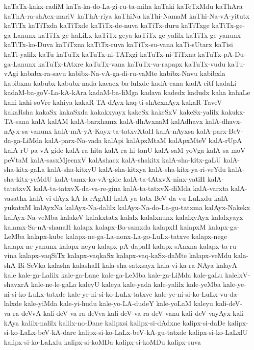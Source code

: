 {kaTaTx-kakx-radiM
kaTa-ka-do-La-gi-ru-ta-miha
kaTaki
kaTeTxMdu
kaThAra
kaThA-ra-shAcx-mariV
kaThA-riya
kaThiNa
kaThi-NamaM
kaThi-Na-vA-yitutx
kaTiTx
kaTiTxda
kaTiTxde
kaTiTx-de-nuva
kaTiTx-duru
kaTiTxge
kaTiTx-ge-ga-Lanunx
kaTiTx-ge-haLiLx
kaTiTx-geya
kaTiTx-ge-yalilx
kaTiTx-ge-yanunx
kaTiTx-ko-Duva
kaTiTxna
kaTiTx-ruva
kaTiTx-su-vana
kaTi-sUtarx
kaTisi
kaTi-yalilx
kaTu
kaTuTx
kaTuTx-ni-TATxgi
kaTuTx-ni-TiTxna
kaTuTx-pA-Du-ga-Lanunx
kaTuTx-tAtxre
kaTuTx-vana
kaTuTx-va-rapapx
kaTuTx-vudu
kaTu-vAgi
kababx-ra-savu
kabibx-Na-vA-ga-di-ru-vaMte
kabibx-Navu
kabibxla
kabibxna
kabubx
kabubx-nada
kacacx-ba-lulxde
kadA-cana
kadA-citf
kadaLi
kadaM-ba-goV-La-kA-kAra
kadaM-ba-liMga
kadava
kadedx
kadudx
kaha
kahaLe
kahi
kahi-soVre
kahiya
kakaR-TA-dAyx-kaq-ti-shAcxnAyx
kakaR-TaveV
kakaRsha
kakaSx
kakaSxda
kakakxyayx
kakeSx
kakeSxV
kakeSx-yalilx
kakukx-TA-sana
kalA
kalAM
kalA-barxhamx
kalA-dhAvxnaM
kalAdhavx
kalA-dhavx-nAyx-sa-vanunx
kalA-mA-yA-Kayx-ta-tatxvXtaH
kalA-nAyxsa
kalA-parx-BeV-da-ga-LiMda
kalA-parx-Na-vada
kalApi
kalApxMtaM
kalApxMteV
kalA-rUpA
kalA-rU-pa-vA-gide
kalA-ra-hita
kalA-ra-hi-tanU
kalA-saM-yoVga
kalA-sa-moV-peVtaM
kalA-sasxMjecnxV
kalAshacx
kalA-shakitx
kalA-sha-kitx-gaLU
kalA-sha-kitx-gaLa
kalA-sha-kitxyU
kalA-sha-kitxya
kalA-sha-kitx-ya-ri-veYdu
kalA-sha-kitx-yeMdU
kalA-tamx-ka-vA-gide
kalA-ta-tAtxvX-ninx-yatiH
kalA-tatatxvX
kalA-ta-tatxvX-da-va-re-gina
kalA-ta-tatxvX-diMda
kalA-varxta
kalA-vasathx
kalA-vi-dAyx-kA-la-rAgAH
kalA-ya-tatx-BeV-da-vu-LuLxdu
kalA-yukatxM
kalAyxNa
kalAyx-Na-dalilx
kalAyx-Na-do-La-gu-tatxma
kalAyx-Nakekx
kalAyx-Na-veMba
kalakeV
kalakxtatx
kalalx
kalalxnunx
kalalxyAyx
kalalxyayx
kalamx-Sa-nA-shanaH
kalapx
kalapx-Ba-samxda
kalapxH
kalapxM
kalapx-ga-LeMba
kalapx-kube
kalapx-ne-ga-La-nonx-La-go-LuLx-tatxve
kalapx-nege
kalapx-ne-yanunx
kalapx-neyu
kalapx-pA-dapaH
kalapx-sAnxna
kalapx-ta-ru-vina
kalapx-vaqSiTx
kalapx-vaqkaSx
kalapx-vaq-kaSx-daMte
kalapx-veMdu
kala-shA-Bi-SeVka
kalasha
kalashaH
kala-sha-satxsayx
kala-vi-ka-ra-NAya
kalayA
kale
kale-ga-Lalilx
kale-ga-Lane
kale-ga-LeMba
kale-ga-LiMda
kale-gaLu
kalelxV-shavxrA
kale-ne-le-gaLa
kaleyU
kaleya
kale-yada
kale-yalilx
kale-yeMba
kale-ye-ni-si-ko-LuLx-tatxde
kale-ye-ni-si-ko-LuLx-tatxve
kale-ye-ni-si-ko-LuLx-vu-da-lalxde
kale-yiMda
kale-yi-hudu
kale-yo-LA-dudeY
kale-yoLaM
kaleyu
kali-deV-va-ra-deVvA
kali-deV-va-ra-deVva
kali-deV-va-ra-deV-vanu
kali-deV-vayAyx
kali-kAya
kalilx-nalilx
kalilx-no-Dane
kalipxsi
kalipx-si-dAdxne
kalipx-si-daDe
kalipx-si-ko-LaLx-beV-kA-dare
kalipx-si-ko-LaLx-beV-kA-gu-tatxde
kalipx-si-ko-LaLxlU
kalipx-si-ko-LaLxlu
kalipx-si-koMDa
kalipx-si-koMDu
kalipx-suva
}

